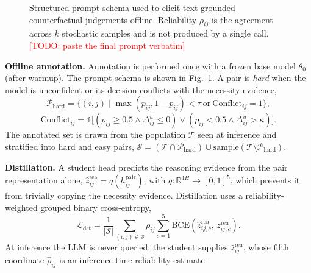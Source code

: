 \documentclass[journal]{IEEEtran}
\newcommand{\todo}[1]{\textcolor{red}{[TODO: #1]}}
\newcommand{\Real}{\mathbb{R}}
\begin{document}
\begin{figure}[t]
\centering
\footnotesize
{}
\caption{Structured prompt schema used to elicit text-grounded counterfactual
judgements offline. Reliability $\rho_{ij}$ is the agreement across $k$ stochastic
samples and is not produced by a single call. \todo{paste the final prompt verbatim}}
\label{fig:prompt}
\end{figure}

\noindent\textbf{Offline annotation.} Annotation is performed once with a frozen base model
$\theta_0$ (after warmup). The prompt schema is shown in Fig.~\ref{fig:prompt}. A pair is \emph{hard} when the model is unconfident or its decision
conflicts with the necessity evidence,
\begin{equation}
\mathcal{P}_{\mathrm{hard}}=\big\{(i,j)\mid \max(p_{ij},1-p_{ij})<\tau \ \text{or}\ \mathrm{Conflict}_{ij}=1\big\},
\end{equation}
\begin{equation}
\mathrm{Conflict}_{ij}=\mathbb{1}\big[(p_{ij}\!\ge\!0.5\wedge \Delta_{ij}^{u}\!\le\!0)\vee(p_{ij}\!<\!0.5\wedge \Delta_{ij}^{u}\!>\!\kappa)\big].
\end{equation}
The annotated set is drawn from the population $\mathcal{T}$ seen at inference and stratified
into hard and easy pairs, $\mathcal{S}=(\mathcal{T}\cap\mathcal{P}_{\mathrm{hard}})\cup
\mathrm{sample}(\mathcal{T}\setminus\mathcal{P}_{\mathrm{hard}})$.

\noindent\textbf{Distillation.} A student head predicts the reasoning evidence from the pair
representation alone, $\hat z_{ij}^{\mathrm{rea}}=q(h_{ij}^{\mathrm{pair}})$, with
$q:\Real^{4H}\to[0,1]^{5}$, which prevents it from trivially copying the necessity evidence.
Distillation uses a reliability-weighted grouped binary cross-entropy,
\begin{equation}
\mathcal{L}_{\mathrm{dst}}=\frac{1}{|\mathcal{S}|}\sum_{(i,j)\in\mathcal{S}}\rho_{ij}\sum_{c=1}^{5}\mathrm{BCE}\!\left(\hat z_{ij,c}^{\mathrm{rea}},\,z_{ij,c}^{\mathrm{rea}}\right).
\end{equation}
At inference the LLM is never queried; the student supplies $\hat z_{ij}^{\mathrm{rea}}$,
whose fifth coordinate $\hat\rho_{ij}$ is an inference-time reliability estimate.
\end{document}
